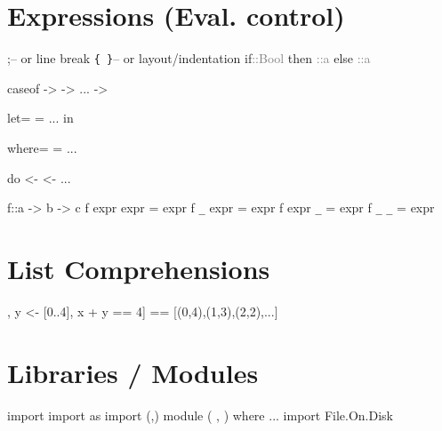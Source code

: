 \documentclass{refcard}
\begin{document}
\section{Expressions (Eval. control)}

\begin{ldesc}
	         ;\s\s\s\s-- or line break
	          \verb+{ }+\s\s-- or layout/indentation
	\li
	\li[if expression]
		if\s{}\s\textcolor{gray}{::\s{}Bool} \li
		\s\s{}then\s{} \textcolor{gray}{::\s{}a} \li
		\s\s{}else\s{} \textcolor{gray}{::\s{}a} \li

		case\s{}\s{}of     \li
		\s\s{}\s->\s{}   \li
		\s\s{}\s->\s{}   \li
		\s\s... \li
		\s\s{}\I{\_}\s->\s{}   \li

		let\s{}= \li
		\s\s\s\s{}= \li
		\s\s\s\s... \li
		in\s{} \li

		 \li
		where\s{}= \li
		\s\s\s\s\s\s{}= \li
		\s\s\s\s\s\s... \li

	\li[do notation]
		do       \li
		\s\s\s{} <-  \li
		\s\s\s{} \li
		\s\s\s{} <-  \li
		\s\s\s{}... \li

		f\s::\s{}a -> b -> c 
		f expr expr = expr \li
		f \verb+_+\s\s\s{} expr = expr \li
		f expr \verb+_+\s\s\s{} = expr \li
		f \verb+_+\s\s\s{} \verb+_+\s\s\s{} = expr
\end{ldesc}


\section{List Comprehensions}

\begin{ldesc}
	\li[pairs where sum=4] [(x,y) | \li
	                       \s\s{}x <- [0..4], \li
						   \s\s{}y <- [0..4], \li
						   \s\s{}x + y == 4] \li
	                       == [(0,4),(1,3),(2,2),...]
\end{ldesc}


\section{Libraries / Modules}

\begin{ldesc}
	\li[importing]              import 
	  import  as 
	     import  (,)
	\li[declaring]
		module  \li
		\s\s(  \li
		\s\s,  \li
		\s\s) \li
		where \li
	    ... \li
	 import File.On.Disk
\end{ldesc}
\end{document}
